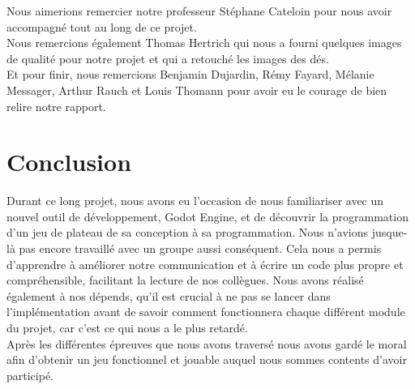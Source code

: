 \documentclass[a4paper,11pt]{article}
\begin{document}
Nous aimerions remercier notre professeur Stéphane Cateloin pour nous avoir accompagné tout au long de ce projet.  \\
Nous remercions également Thomas Hertrich qui nous a fourni quelques images de qualité pour notre projet et qui a retouché les images des dés.  \\
Et pour finir, nous remercions Benjamin Dujardin, Rémy Fayard, Mélanie Messager, Arthur Rauch et Louis Thomann pour avoir eu le courage de bien relire notre rapport. \\

\section{Conclusion}

Durant ce long projet, nous avons eu l’occasion de nous familiariser avec un nouvel outil de développement, Godot Engine, et de découvrir la programmation d’un jeu de plateau de sa conception à sa programmation. Nous n’avions jusque-là pas encore travaillé avec un groupe aussi conséquent. Cela nous a permis d’apprendre à améliorer notre communication et à écrire un code plus propre et compréhensible, facilitant la lecture de nos collègues. Nous avons réalisé également à nos dépends, qu’il est crucial  à ne pas se lancer dans l’implémentation avant de savoir comment fonctionnera chaque différent module du projet, car c’est ce qui nous a le plus retardé. \\

	Après les différentes épreuves que nous avons traversé nous avons gardé le moral afin d’obtenir un jeu fonctionnel et jouable auquel nous sommes contents d’avoir participé.
\end{document}
